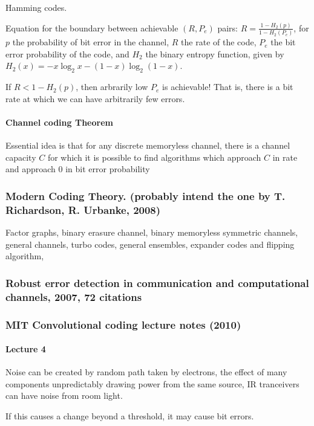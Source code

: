 \documentclass{article}
\begin{document}
Hamming codes.

Equation for the boundary between achievable $(R, P_e)$ pairs: $R = \frac{1 - H_2(p)}{1 - H_2(P_e)}$, for $p$ the probability of bit error in the channel, $R$ the rate of the code, $P_e$ the bit error probability of the code, and $H_2$ the binary entropy function, given by $H_2(x) = -x\log_2 x - (1 - x) \log_2(1-x)$.

If $R < 1 - H_2(p)$, then arbrarily low $P_e$ is achievable! That is, there is a bit rate at which we can have arbitrarily few errors.

\paragraph{Channel coding Theorem}

Essential idea is that for any discrete memoryless channel, there is a channel capacity $C$ for which  it is possible to find algorithms which approach $C$ in rate and approach 0 in bit error probability


\subsubsection{Modern Coding Theory. (probably intend the one by T. Richardson, R. Urbanke, 2008)}

Factor graphs, binary erasure channel, binary memoryless symmetric channels, general channels, turbo codes, general ensembles, expander codes and flipping algorithm,

\subsubsection{Robust error detection in communication and computational channels, 2007, 72 citations}

\subsubsection{MIT Convolutional coding lecture notes (2010)}

\paragraph{Lecture 4}

Noise can be created by random path taken by electrons, the effect of many components unpredictably drawing power from the same source, IR tranceivers can have noise from room light.

If this causes a change beyond a threshold, it may cause bit errors.
\end{document}
